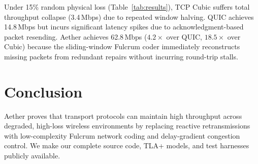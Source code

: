 \documentclass[10pt,twocolumn]{article}
\begin{document}
Under 15\% random physical loss (Table~\ref{tab:results}), TCP Cubic suffers total throughput collapse (3.4\,Mbps) due to repeated window halving. QUIC achieves 14.8\,Mbps but incurs significant latency spikes due to acknowledgment-based packet resending. Aether achieves 62.8\,Mbps ($4.2\times$ over QUIC, $18.5\times$ over Cubic) because the sliding-window Fulcrum coder immediately reconstructs missing packets from redundant repairs without incurring round-trip stalls.

\section{Conclusion}
Aether proves that transport protocols can maintain high throughput across degraded, high-loss wireless environments by replacing reactive retransmissions with low-complexity Fulcrum network coding and delay-gradient congestion control. We make our complete source code, TLA+ models, and test harnesses publicly available.



\end{document}
